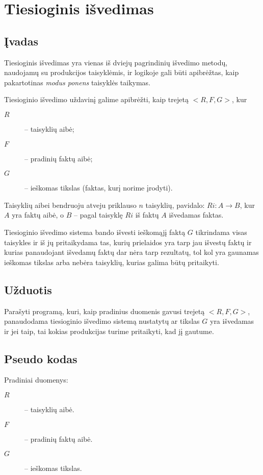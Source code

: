 \chapter{Tiesioginis išvedimas}

\section{Įvadas}

Tiesioginis išvedimas yra vienas iš dviejų pagrindinių išvedimo metodų,
naudojamų su produkcijos taisyklėmis, ir logikoje gali būti
apibrėžtas, kaip pakartotinas \emph{modus ponens} taisyklės
taikymas.

Tiesioginio išvedimo uždavinį galime apibrėžti, kaip trejetą
$<R, F, G>$, kur
\begin{description}
  \item[$R$] – taisyklių aibė;
  \item[$F$] – pradinių faktų aibė;
  \item[$G$] – ieškomas tikslas (faktas, kurį norime įrodyti).
\end{description}
Taisyklių aibei bendruoju atveju priklauso $n$ taisyklių, pavidalo:
$Ri: A \to B$, kur $A$ yra faktų aibė, o $B$ – pagal taisyklę
$Ri$ iš faktų $A$ išvedamas faktas.

Tiesioginio išvedimo sistema bando išvesti ieškomąjį faktą $G$
tikrindama visas taisykles ir iš jų pritaikydama tas, kurių
prielaidos yra tarp jau išvestų faktų ir kurias panaudojant išvedamų
faktų dar nėra tarp rezultatų, tol kol yra gaunamas ieškomas tikslas
arba nebėra taisyklių, kurias galima būtų pritaikyti.

\section{Užduotis}

Parašyti programą, kuri, kaip pradinius duomenis gavusi trejetą
$<R, F, G>$, panaudodama tiesioginio išvedimo sistemą nustatytų
ar tikslas $G$ yra išvedamas ir jei taip, tai kokias produkcijas
turime pritaikyti, kad jį gautume.

\section{Pseudo kodas}

\label{sec:fc:pseudo}

Pradiniai duomenys:
\begin{description}
  \item[$R$] – taisyklių aibė.
  \item[$F$] – pradinių faktų aibė.
  \item[$G$] – ieškomas tikslas.
\end{description}

